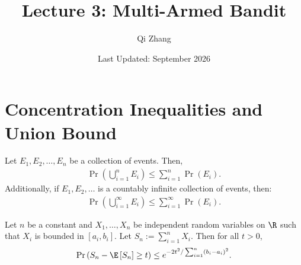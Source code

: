\newcommand{\Regret}{\operatorname{Regret}}


\title{Lecture 3: Multi-Armed Bandit}
\author{Qi Zhang}
\date{Last Updated: September 2026}

\section{Concentration Inequalities and Union Bound}

\begin{theorem}
\label{theorem:The union bound}
Let $E_1, E_2, \ldots, E_n$ be a collection of events. Then,
\begin{align*}
\Pr\left(\bigcup_{i=1}^n E_i\right) \leq \sum_{i=1}^n \Pr\left(E_i\right)
.
\end{align*}
Additionally, if $E_1, E_2, \ldots$ is a countably infinite collection of events, then:
\begin{align*}
\Pr\left(\bigcup_{i=1}^{\infty} E_i\right) \leq \sum_{i=1}^{\infty} \Pr\left(E_i\right)
.
\end{align*}
\end{theorem}

\begin{theorem}
\label{theorem:Hoeffding's inequality}
Let $n$ be a constant and $X_1, \ldots, X_n$ be independent random variables on $\R$ such that $X_i$ is bounded in $\left[a_i, b_i\right]$. Let $S_n:=\sum_{i=1}^n X_i$. Then for all $t>0$,
\begin{align*}
\Pr\left(S_n-\E\left[S_n\right] \geq t\right) \leq e^{-2 t^2 / \sum_{i=1}^n\left(b_i-a_i\right)^2}.
\end{align*}
\end{theorem}

